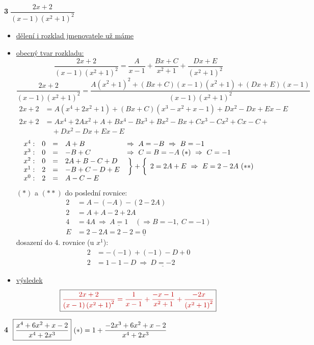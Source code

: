 \documentclass[11pt,a4paper]{article}
\newcommand{\vysl}[1]{\boxed{\color{red!75!black}#1}}
\newcommand{\pozn}[1]{{\color{red!75!black}#1}}
\newcommand{\tm}[2]{\tikz[remember picture, baseline=(#1.base)]\node[inner sep=0pt, outer sep=1pt] (#1) {$\displaystyle #2$};}
\newcommand{\spoj}[2]{\raisebox{-7.2pt}[0pt][0pt]{$\left.\vphantom{\rule[-9.3pt]{0pt}{24pt}}\right\}#1\left\{\vphantom{\rule[-9.3pt]{0pt}{24pt}}\right.#2$}}
\begin{document}
\newpage
\textbf{\textcircled{3}}\quad $\boxed{\dfrac{2x+2}{(x-1)\left(x^2+1\right)^2}}$

\begin{itemize}
\item \underline{dělení i rozklad jmenovatele už máme}
\item \underline{obecný tvar rozkladu:}
\[
\frac{2x+2}{(x-1)\left(x^2+1\right)^2} = \frac{A}{x-1}+\frac{Bx+C}{x^2+1}+\frac{Dx+E}{\left(x^2+1\right)^2}
\]
\[
\frac{2x+2}{(x-1)\left(x^2+1\right)^2} = \textstyle\frac{A\left(x^2+1\right)^2+(Bx+C)(x-1)\left(x^2+1\right)+(Dx+E)(x-1)}{(x-1)\left(x^2+1\right)^2}
\]
\begin{align*}
2x+2 &= A\left(x^4+2x^2+1\right)+(Bx+C)\left(x^3-x^2+x-1\right)+Dx^2-Dx+Ex-E\\
2x+2 &= Ax^4+2Ax^2+A+Bx^4-Bx^3+Bx^2-Bx+Cx^3-Cx^2+Cx-C+{}\\ &\quad+Dx^2-Dx+Ex-E
\end{align*}
\[
\begin{array}{lrcll}
x^4: & 0 &=& A+B & \Rightarrow\ A=-B \ \Rightarrow\ B=-1\\
x^3: & 0 &=& -B+C & \Rightarrow\ C=B=-A\ (*) \ \Rightarrow\ C=-1\\
x^2: & 0 &=& 2A+B-C+D & \spoj{+}{\,2=2A+E \ \Rightarrow\ E=2-2A\ (**)}\\
x^1: & 2 &=& -B+C-D+E & \\
x^0: & 2 &=& A-C-E &
\end{array}
\]
$(*)$ a $(**)$ do poslední rovnice:
\begin{align*}
2 &= A-(-A)-(2-2A)\\
2 &= A+A-2+2A\\
4 &= 4A \ \Rightarrow\ \underline{A=1}\quad(\Rightarrow B=-1,\ C=-1)\\
E &= 2-2A = 2-2 = \underline{0}
\end{align*}
dosazení do 4. rovnice (u $x^1$):
\begin{align*}
2 &= -(-1)+(-1)-D+0\\
2 &= 1-1-D \ \Rightarrow\ \underline{D=-2}
\end{align*}
\item \pozn{\underline{výsledek}}
\[
\vysl{\frac{2x+2}{(x-1)\left(x^2+1\right)^2} = \frac{1}{x-1}+\frac{-x-1}{x^2+1}+\frac{-2x}{\left(x^2+1\right)^2}}
\]
\end{itemize}

\newpage
\textbf{\textcircled{4}}\quad
$\boxed{\dfrac{x^4+6x^2+x-2}{x^4+2x^3}}\ (*) = 1+\tm{rem}{\frac{-2x^3+6x^2+x-2}{x^4+2x^3}}$
\end{document}
